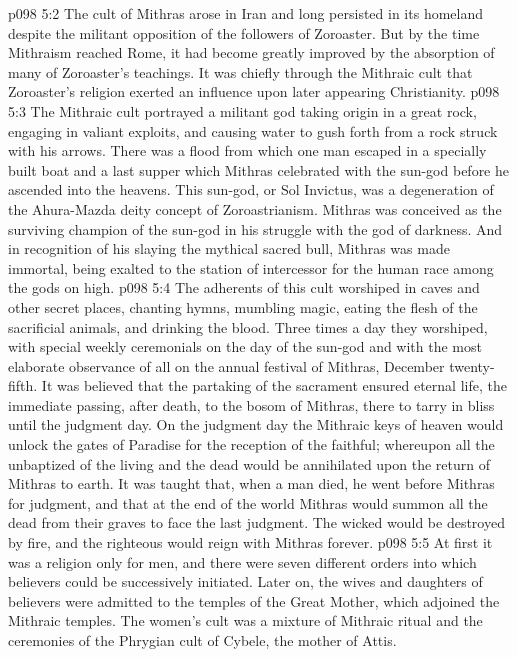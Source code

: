 \vs p098 5:2 The cult of Mithras arose in Iran and long persisted in its homeland despite the militant opposition of the followers of Zoroaster. But by the time Mithraism reached Rome, it had become greatly improved by the absorption of many of Zoroaster’s teachings. It was chiefly through the Mithraic cult that Zoroaster’s religion exerted an influence upon later appearing Christianity.
\pc \vs p098 5:3 The Mithraic cult portrayed a militant god taking origin in a great rock, engaging in valiant exploits, and causing water to gush forth from a rock struck with his arrows. There was a flood from which one man escaped in a specially built boat and a last supper which Mithras celebrated with the sun\hyp{}god before he ascended into the heavens. This sun\hyp{}god, or Sol Invictus, was a degeneration of the Ahura\hyp{}Mazda deity concept of Zoroastrianism. Mithras was conceived as the surviving champion of the sun\hyp{}god in his struggle with the god of darkness. And in recognition of his slaying the mythical sacred bull, Mithras was made immortal, being exalted to the station of intercessor for the human race among the gods on high.
\vs p098 5:4 The adherents of this cult worshiped in caves and other secret places, chanting hymns, mumbling magic, eating the flesh of the sacrificial animals, and drinking the blood. Three times a day they worshiped, with special weekly ceremonials on the day of the sun\hyp{}god and with the most elaborate observance of all on the annual festival of Mithras, December twenty\hyp{}fifth. It was believed that the partaking of the sacrament ensured eternal life, the immediate passing, after death, to the bosom of Mithras, there to tarry in bliss until the judgment day. On the judgment day the Mithraic keys of heaven would unlock the gates of Paradise for the reception of the faithful; whereupon all the unbaptized of the living and the dead would be annihilated upon the return of Mithras to earth. It was taught that, when a man died, he went before Mithras for judgment, and that at the end of the world Mithras would summon all the dead from their graves to face the last judgment. The wicked would be destroyed by fire, and the righteous would reign with Mithras forever.
\vs p098 5:5 At first it was a religion only for men, and there were seven different orders into which believers could be successively initiated. Later on, the wives and daughters of believers were admitted to the temples of the Great Mother, which adjoined the Mithraic temples. The women’s cult was a mixture of Mithraic ritual and the ceremonies of the Phrygian cult of Cybele, the mother of Attis.\plusone
